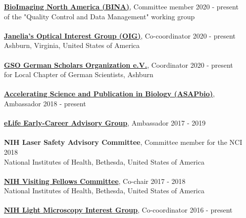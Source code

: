 \documentclass[margin,line]{res}
\begin{document}
\begin{resume}
{\bf \href{https://www.bioimagingna.org/}{BioImaging North America (BINA)}}, Committee member \hfill {2020 - present}\\
of the "Quality Control and Data Management" working group\\
\vspace*{-3mm}\\
{\bf \href{https://www.janelia.org/content/optical-interest-group}{Janelia's Optical Interest Group (OIG)}}, Co-coordinator \hfill {2020 - present}\\
Ashburn, Virginia, United States of America\\
\vspace*{-3mm}\\
{\bf \href{https://www.gain-network.org/en/about-gain/gain-chapters/}{GSO German Scholars Organization e.V.}}, Coordinator  \hfill {2020 - present}\\
for Local Chapter of German Scientists, Ashburn\\
\vspace*{-3mm}\\
{\bf \href{https://asapbio.org/preprint-info/preprint-stories}{Accelerating Science and Publication in Biology (ASAPbio)}}, Ambassador \hfill {2018 - present}\\
\vspace*{-3mm}\\
{\bf \href{hhttps://elifesciences.org/inside-elife/912b0679/early-career-advisory-group-elife-welcomes-150-ambassadors-of-good-practice-in-science}{eLife Early-Career Advisory Group}}, Ambassador \hfill {2017 - 2019}\\
\vspace*{-3mm}\\
{\bf NIH Laser Safety Advisory Committee}, Committee member for the NCI \hfill {2018}\\
National Institutes of Health, Bethesda, United States of America\\
\vspace*{-3mm}\\
{\bf \href{https://www.training.nih.gov/felcom/visitingfellows2}{NIH Visiting Fellows Committee}}, Co-chair \hfill {2017 - 2018}\\
National Institutes of Health, Bethesda, United States of America\\
\vspace*{-3mm}\\
{\bf \href{https://confocal.ccr.cancer.gov/light-microscopy-interest-group/}{ NIH Light Microscopy Interest Group}}, Co-coordinator \hfill {2016 - present}\\

\end{resume}
\end{document}
